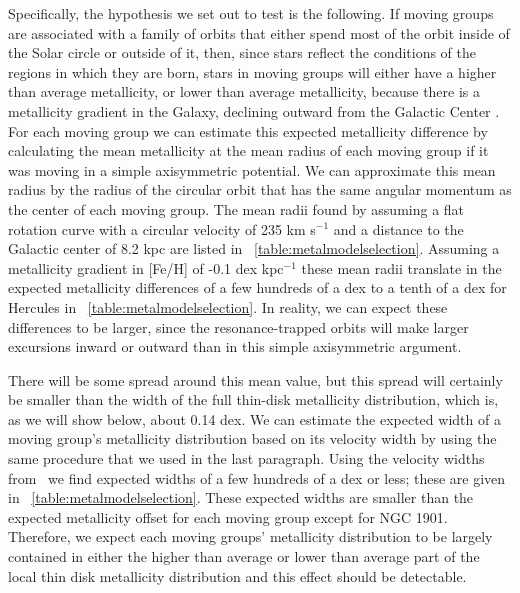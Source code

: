Specifically, the hypothesis we set out to test is the following. If
moving groups are associated with a family of orbits that either spend
most of the orbit inside of the Solar circle or outside of it, then,
since stars reflect the conditions of the regions in which they are
born, stars in moving groups will either have a higher than average
metallicity, or lower than average metallicity, because there is a
metallicity gradient in the Galaxy, declining outward from the
Galactic Center
\citep[\eg,][]{Shaver83a,Afflerbach97a,2004A&A...418..989N,Rudolph06a}. For
each moving group we can estimate this expected metallicity difference
by calculating the mean metallicity at the mean radius of each moving
group if it was moving in a simple axisymmetric potential. We can
approximate this mean radius by the radius of the circular orbit that
has the same angular momentum as the center of each moving group. The
mean radii found by assuming a flat rotation curve with a circular
velocity of 235 km s$^{-1}$ and a distance to the Galactic center of
8.2 kpc \citep{BovyXD} are listed in
\tablename~\ref{table:metalmodelselection}. Assuming a metallicity
gradient in [Fe/H] of -0.1 dex kpc$^{-1}$
\citep[\eg,][]{Mayor76a,2004A&A...418..989N} these mean radii translate in
the expected metallicity differences of a few hundreds of a dex to a
tenth of a dex for Hercules in
\tablename~\ref{table:metalmodelselection}. In reality, we can expect
these differences to be larger, since the resonance-trapped orbits
will make larger excursions inward or outward than in this simple
axisymmetric argument.

There will be some spread around this mean value, but this spread will
certainly be smaller than the width of the full thin-disk metallicity
distribution, which is, as we will show below, about 0.14 dex. We can
estimate the expected width of a moving group's metallicity
distribution based on its velocity width by using the same procedure
that we used in the last paragraph. Using the velocity widths from
\bhr\, we find expected widths of a few hundreds of a dex or less;
these are given in \tablename~\ref{table:metalmodelselection}. These
expected widths are smaller than the expected metallicity offset for
each moving group except for NGC 1901. Therefore, we expect each
moving groups' metallicity distribution to be largely contained in
either the higher than average or lower than average part of the local
thin disk metallicity distribution and this effect should be
detectable.

